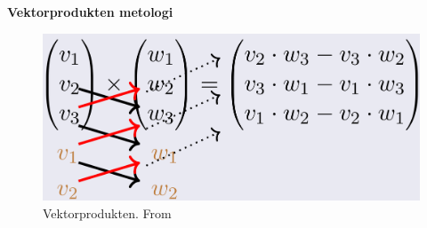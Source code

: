 \newpage
\textbf{Vektorprodukten metologi}
\begin{figure}[h]
    \vspace{10mm}
    \centering
    \includegraphics[width=12cm, height=5cm]{image/vektorprodukt.png} 
    \caption{Vektorprodukten. From \cite{}}
\end{figure}

